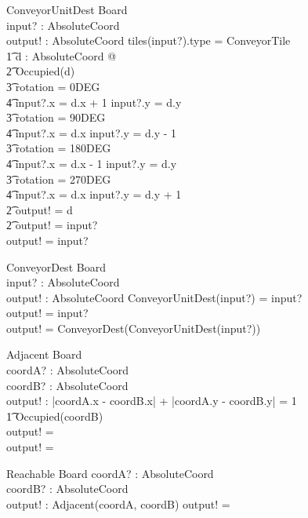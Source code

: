 \documentclass[12pt]{article}
\begin{document}
\begin{schema}{ConveyorUnitDest}
\Xi Board \\
input? : AbsoluteCoord \\
output! : AbsoluteCoord
\where
\IF tiles(input?).type = ConveyorTile \; \; \wedge \\ \t1
\exists d : AbsoluteCoord @ \\ \t2
\IF \neg Occupied(d) \; \; \wedge \\ \t3
rotation = 0DEG \Rightarrow \\ \t4 input?.x = d.x + 1 \wedge input?.y = d.y \\ \t3
rotation = 90DEG \Rightarrow \\ \t4 input?.x = d.x \wedge input?.y = d.y - 1
\\ \t3
rotation = 180DEG \Rightarrow \\ \t4 input?.x = d.x - 1 \wedge input?.y = d.y \\ \t3
rotation = 270DEG \Rightarrow \\ \t4 input?.x = d.x \wedge input?.y = d.y + 1 \\ \t2
\THEN output! = d \\ \t2
\ELSE output! = input? \\
\ELSE output! = input?
\end{schema}

\begin{schema}{ConveyorDest}
\Xi Board \\
input? : AbsoluteCoord \\
output! : AbsoluteCoord
\where
\IF  ConveyorUnitDest(input?) = input? \\
\THEN output! = input? \\
\ELSE output! = ConveyorDest(ConveyorUnitDest(input?))
\end{schema}

\begin{schema}{Adjacent}
\Xi Board \\
coordA? : AbsoluteCoord \\
coordB? : AbsoluteCoord \\
output! : \bool
\where
\IF |\!coordA.x - coordB.x\!| + |\!coordA.y - coordB.y\!| \: = 1 \; \wedge \\ \t1
\neg Occupied(coordB) \\
\THEN output! = \true \\
\ELSE output! = \false
\end{schema}

\begin{schema}{Reachable}
\Xi Board
coordA? : AbsoluteCoord \\
coordB? : AbsoluteCoord \\
output! : \bool
\where
\IF Adjacent(coordA, coordB)
\THEN
output! = \true
\end{schema}
\end{document}
